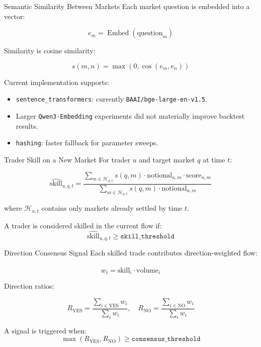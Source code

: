 \documentclass[11pt,aspectratio=169]{beamer}
\begin{document}
\begin{frame}{Semantic Similarity Between Markets}
  Each market question is embedded into a vector:

  \[
    e_m = \operatorname{Embed}(\text{question}_m)
  \]

  Similarity is cosine similarity:

  \[
    s(m, n) = \max \left(0, \cos(e_m, e_n)\right)
  \]

  \vspace{0.2cm}
  Current implementation supports:
  \begin{itemize}
    \item \texttt{sentence\_transformers}: currently \texttt{BAAI/bge-large-en-v1.5}.
    \item Larger \texttt{Qwen3-Embedding} experiments did not materially improve backtest results.
    \item \texttt{hashing}: faster fallback for parameter sweeps.
  \end{itemize}
\end{frame}

\begin{frame}{Trader Skill on a New Market}
  For trader $u$ and target market $q$ at time $t$:

  \[
    \widehat{\text{skill}}_{u,q,t}
    =
    \frac{
      \sum_{m \in \mathcal{H}_{u,t}}
      s(q,m) \cdot \text{notional}_{u,m} \cdot \text{score}_{u,m}
    }{
      \sum_{m \in \mathcal{H}_{u,t}}
      s(q,m) \cdot \text{notional}_{u,m}
    }
  \]

  \vspace{0.2cm}
  where $\mathcal{H}_{u,t}$ contains only markets already settled by time $t$.

  \vspace{0.2cm}
  A trader is considered skilled in the current flow if:
  \[
    \widehat{\text{skill}}_{u,q,t} \geq \texttt{skill\_threshold}
  \]
\end{frame}

\begin{frame}{Direction Consensus Signal}
  Each skilled trade contributes direction-weighted flow:

  \[
    w_i = \widehat{\text{skill}}_i \cdot \text{volume}_i
  \]

  Direction ratios:

  \[
    R_{\text{YES}} =
    \frac{\sum_{i \in \text{YES}} w_i}
         {\sum_i w_i},
    \quad
    R_{\text{NO}} =
    \frac{\sum_{i \in \text{NO}} w_i}
         {\sum_i w_i}
  \]

  A signal is triggered when:
  \[
    \max(R_{\text{YES}}, R_{\text{NO}})
    \geq
    \texttt{consensus\_threshold}
  \]
\end{frame}
\end{document}
